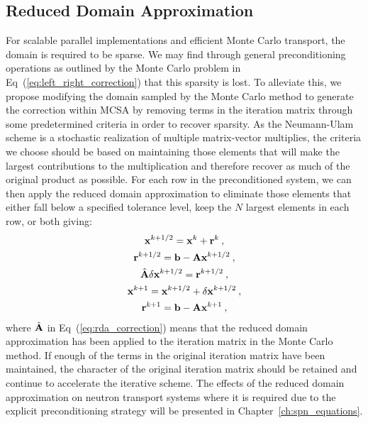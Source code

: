 \subsection{Reduced Domain Approximation}
\label{subsec:reduced_domain_approximation}
For scalable parallel implementations and efficient Monte Carlo
transport, the domain is required to be sparse. We may find through
general preconditioning operations as outlined by the Monte Carlo
problem in Eq~(\ref{eq:left_right_correction}) that this sparsity is
lost. To alleviate this, we propose modifying the domain sampled by
the Monte Carlo method to generate the correction within MCSA by
removing terms in the iteration matrix through some predetermined
criteria in order to recover sparsity. As the Neumann-Ulam scheme is a
stochastic realization of multiple matrix-vector multiplies, the
criteria we choose should be based on maintaining those elements that
will make the largest contributions to the multiplication and
therefore recover as much of the original product as possible. For
each row in the preconditioned system, we can then apply the reduced
domain approximation to eliminate those elements that either fall
below a specified tolerance level, keep the $N$ largest elements in
each row, or both giving:
\begin{subequations}
  \begin{gather}
    \mathbf{x}^{k+1/2} = \mathbf{x}^k + \mathbf{r}^k\:,\\
    \mathbf{r}^{k+1/2} = \mathbf{b} - \mathbf{A}\mathbf{x}^{k+1/2}\:,\\
    \hat{\mathbf{A}}\delta\mathbf{x}^{k+1/2} = \mathbf{r}^{k+1/2}\:, 
    \label{eq:rda_correction}\\
    \mathbf{x}^{k+1} = \mathbf{x}^{k+1/2} + \delta \mathbf{x}^{k+1/2}\:,\\
    \mathbf{r}^{k+1} = \mathbf{b} - \mathbf{A}\mathbf{x}^{k+1}\:,
  \end{gather}
  \label{eq:rda_mcsa}
\end{subequations}
where $\hat{\mathbf{A}}$ in Eq~(\ref{eq:rda_correction}) means that the
reduced domain approximation has been applied to the iteration matrix
in the Monte Carlo method. If enough of the terms in the original
iteration matrix have been maintained, the character of the original
iteration matrix should be retained and continue to accelerate the
iterative scheme. The effects of the reduced domain approximation on
neutron transport systems where it is required due to the explicit
preconditioning strategy will be presented in
Chapter~\ref{ch:spn_equations}.

\clearpage
